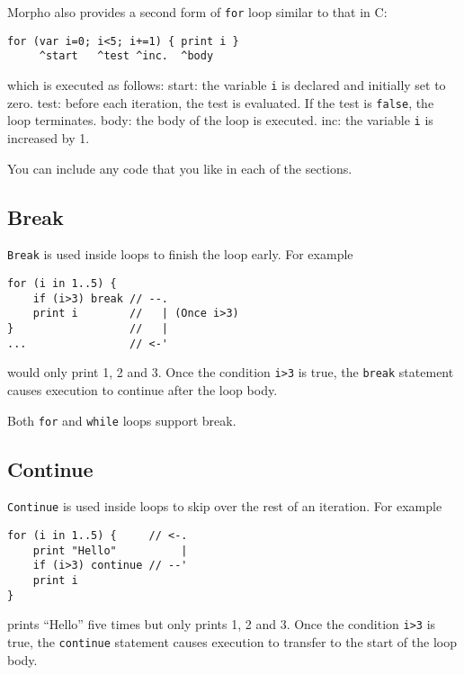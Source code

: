 Morpho also provides a second form of \texttt{for} loop similar to that
in C:

\begin{lstlisting}
for (var i=0; i<5; i+=1) { print i }
     ^start   ^test ^inc.  ^body
\end{lstlisting}

which is executed as follows: start: the variable \texttt{i} is declared
and initially set to zero. test: before each iteration, the test is
evaluated. If the test is \texttt{false}, the loop terminates. body: the
body of the loop is executed. inc: the variable \texttt{i} is increased
by 1.

You can include any code that you like in each of the sections.

\hypertarget{break}{%
\subsection{Break}\label{break}}

\texttt{Break} is used inside loops to finish the loop early. For
example

\begin{lstlisting}
for (i in 1..5) {
    if (i>3) break // --.
    print i        //   | (Once i>3)
}                  //   |
...                // <-'
\end{lstlisting}

would only print 1, 2 and 3. Once the condition
\texttt{i\textgreater{}3} is true, the \texttt{break} statement causes
execution to continue after the loop body.

Both \texttt{for} and \texttt{while} loops support break.

\hypertarget{continue}{%
\subsection{Continue}\label{continue}}

\texttt{Continue} is used inside loops to skip over the rest of an
iteration. For example

\begin{lstlisting}
for (i in 1..5) {     // <-.
    print "Hello"          |
    if (i>3) continue // --'
    print i
}                     
\end{lstlisting}

prints ``Hello'' five times but only prints 1, 2 and 3. Once the
condition \texttt{i\textgreater{}3} is true, the \texttt{continue}
statement causes execution to transfer to the start of the loop body.

